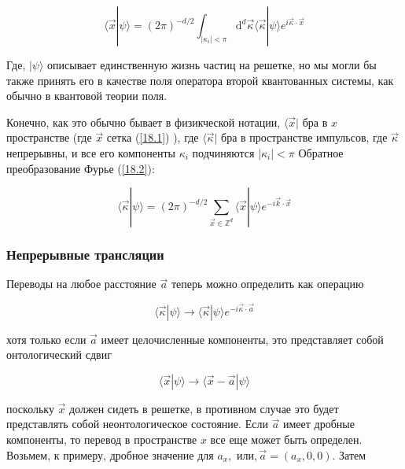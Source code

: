 \documentclass[main.tex]{subfiles}
\begin{document}
\begin{equation}\label{18.2}
	\langle\vec{x} | \psi\rangle=(2 \pi)^{-d / 2} \int_{\left|\kappa_{i}\right|<\pi} \mathrm{d}^{d} \vec{\kappa}\langle\vec{\kappa} | \psi\rangle e^{i \vec{\kappa} \cdot \vec{x}}
\end{equation}

Где, $|\psi\rangle$ описывает единственную жизнь частиц на решетке, но мы могли бы также принять его в качестве поля оператора второй квантованных системы, как обычно в квантовой теории поля.

Конечно, как это обычно бывает в физикческой нотации, $\langle\vec{x}|$ бра в $x$ пространстве (где $\vec{x}$ сетка (\ref{18.1}) ), где $\langle\vec{\kappa}|$ бра в пространстве импульсов, где $\vec{\kappa}$ непрерывны, и все его компоненты $\kappa_{i}$ подчиняются $\left|\kappa_{i}\right|<\pi$ Обратное преобразование Фурье (\ref{18.2}):

\begin{equation}\label{18.3}
	\langle\vec{\kappa} | \psi\rangle=(2 \pi)^{-d / 2} \sum_{\vec{x} \in \mathbb{Z}^{d}}\langle\vec{x} | \psi\rangle e^{-i \vec{k} \cdot \vec{x}}
\end{equation}



\subsubsection{Непрерывные трансляции}\label{ch18.2.1}

Переводы на любое расстояние $\vec{a}$ теперь можно определить как операцию

\begin{equation}\label{18.4}
	\langle\vec{\kappa} | \psi\rangle \rightarrow\langle\vec{\kappa} | \psi\rangle e^{-i \vec{\kappa} \cdot \vec{a}}
\end{equation}

хотя только если $\vec{a}$ имеет целочисленные компоненты, это представляет собой онтологический сдвиг

\begin{equation}\label{18.5}
	\langle\vec{x} | \psi\rangle \rightarrow\langle\vec{x}-\vec{a} | \psi\rangle
\end{equation}

поскольку $\vec{x}$ должен сидеть в решетке, в противном случае это будет представлять собой неонтологическое состояние. Если $\vec{a}$ имеет дробные компоненты, то перевод в пространстве $x$ все еще может быть определен. Возьмем, к примеру, дробное значение для $a_{x},$ или$, \vec{a}=\left(a_{x}, 0,0\right)$. Затем
\end{document}

